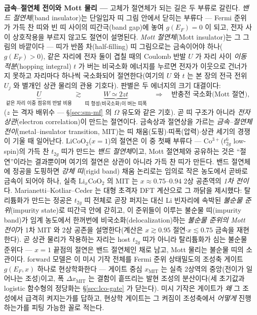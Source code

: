 \begin{bgbox}
\textbf{금속--절연체 전이와 Mott 물리 ---} 고체가 절연체가 되는 길은 두 부류로 갈린다.
\emph{밴드 절연체}(band insulator)는 단일입자 띠 그림 안에서 닫히는 부류다 --- Fermi 준위가 가득 찬 띠와
빈 띠 사이의 띠간극(band gap)에 놓여 $g(E_F){=}0$ 이 되고, 전자 사이 상호작용을 부르지 않고도 절연이
설명된다. \emph{Mott 절연체}(Mott insulator)는 그 그림의 바깥이다 --- 띠가 반쯤 차(half-filling) 띠
그림으로는 금속이어야 하나($g(E_F){>}0$), 같은 자리에 전자 둘이 겹칠 때의 Coulomb 반발 $U$ 가 자리 사이
\emph{이동적분}(hopping integral) $t$ 가 버는 비국소화 에너지를 누르면 전자가 이웃으로 건너가지 못하고
자리마다 하나씩 국소화되어 절연한다(여기의 $U$ 와 $t$ 는 본 장의 전극 전위 $U_j$ 와 별개인 상관 물리의
관용 기호다). 판별은 두 에너지의 크기 대결이다:
\begin{equation}
\underbrace{U}_{\text{같은 자리 이중 점유의 반발 비용}}
\;\gtrsim\;
\underbrace{W\simeq 2zt}_{\text{띠 형성(비국소화)이 버는 띠폭}}
\quad\Longrightarrow\quad
\text{반충전 국소화(Mott 절연)},
\label{eq:lco-mottcrit}
\end{equation}
($z$ 는 격자 배위수 --- \S\ref{sec:sm-mf} 의 $\Omega$ 유도와 같은 기호). 곧 띠 구조가
아니라 \emph{전자 상관}(electron correlation)이 만드는 절연이다\cite{mott1968,imada1998}. 금속상과 절연상을
가르는 \emph{금속--절연체 전이}(metal--insulator transition, MIT)는 띠 채움(도핑)$\cdot$띠폭(압력)$\cdot$상관
세기의 경쟁이 기울 때 일어난다\cite{imada1998}. $\mathrm{LiCoO_2}$($x{=}1$)의 절연은 이 중 첫째 부류다 ---
Co$^{3+}$($t_{2g}^6$ low-spin)의 가득 찬 $t_{2g}$ 띠가 만드는 \emph{밴드 절연체}이고\cite{menetrier1999},
Mott 절연체와 공유하는 것은 ``절연''이라는 결과뿐이며 여기의 절연은 상관이 아니라 가득 찬 띠가 만든다.
밴드 절연체에 정공을 도핑하면 \emph{강체 띠}(rigid band) 채움 논리로는 임의로 작은 농도에서 곧바로 금속이 되어야 하나, 실측
$\mathrm{Li}_x\mathrm{CoO_2}$ 의 MIT 는 $x\approx0.75$--$0.94$ 2상 공존역의 \emph{1차
전이}다\cite{menetrier1999,reimers1992,motohashi2009}. Marianetti--Kotliar--Ceder 는 대형 초격자 DFT 계산으로
그 까닭을 제시했다: 탈리튬화가 만드는 정공은 $t_{2g}$ 띠 전체로 곧장 퍼지는 대신 Li 빈자리에 속박된
\emph{불순물 준위}(impurity state)로 띠간극 안에 갇히고, 이 준위들이 이루는 불순물 띠(impurity band)가 임계
농도에서 한꺼번에 비국소화(delocalization)하는 \emph{불순물 준위의 Mott 전이}가 1차 MIT 와 2상 공존을
설명한다\cite{marianetti2004}(계산은 $x\gtrsim0.95$ 절연$\cdot$$x\lesssim0.75$ 금속을 재현한다). 곧 상관
물리가 작용하는 자리는 host $t_{2g}$ 띠가 아니라 탈리튬화가 심는 불순물 준위다 --- $x{=}1$ 끝점의 절연은 밴드
절연체인 채로 남고, Mott 물리는 불순물 띠의 소관이다. forward 모델은 이 미시 기작 전체를 Fermi 준위
상태밀도의 조성축 게이트 $g(E_F,x)$ 하나로 현상학화한다 --- 게이트 중심 $x_\mathrm{MIT}$ 는 실측 2상역의
중앙(전이가 일어나는 조성)이고, 폭 $\Delta x_\mathrm{MIT}$ 는 결함이 흩뜨리는 발현 조성의 분산이다(세
초기값과 logistic 함수형의 정당화는 \S\ref{sec:lco-gate} 가 닫는다). 미시 기작은 게이트가 \emph{왜} 그
조성에서 급격히 켜지는가를 답하고, 현상학 게이트는 그 켜짐이 조성축에서 \emph{어떻게} 진행하는가를 피팅
가능한 꼴로 적는다.
\end{bgbox}

